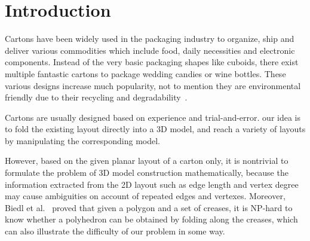 \section{Introduction}

Cartons have been widely used in the packaging industry to organize, ship and deliver various commodities which include food, daily necessities and electronic components. Instead of the very basic packaging shapes like cuboids, there exist multiple fantastic cartons to package wedding candies or wine bottles. 
These various designs increase much popularity, not to mention they are environmental friendly due to their recycling and degradability~\cite{Mullineux:2010:CSC:1739328.1739673}.

Cartons are usually designed based on experience and trial-and-error.
 our idea is to fold the existing layout directly into a 3D model, and reach a variety of layouts by manipulating the corresponding model.

However, based on the given planar layout of a carton only, it is nontrivial to formulate the problem of 3D model construction mathematically, because the information extracted from the 2D layout such as edge length and vertex degree may cause ambiguities on account of repeated edges and vertexes. Moreover, Biedl et al.~\cite{Biedl:2005:NFP:1090462.1646553} proved that given a polygon and a set of creases, it is NP-hard to know whether a polyhedron can be obtained by folding along the creases, which can also illustrate the difficulty of our problem in some way.

